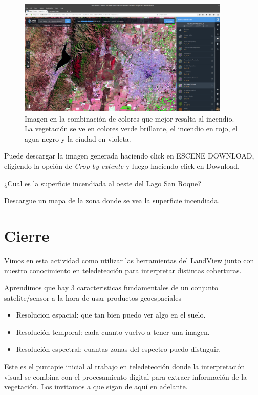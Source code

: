 \documentclass[a4paper,12pt]{book}
\begin{document}
\begin{figure}[h!]
    \centering
    \includegraphics[width=0.9\textwidth]{fig:incendio.png}
    \caption{Imagen en la combinación de colores que mejor resalta al incendio. La vegetación se ve en colores verde brillante, el incendio en rojo, el agua negro y la ciudad en violeta.}
    \label{fig:incendio}
\end{figure}

Puede descargar la imagen generada haciendo click en ESCENE DOWNLOAD, eligiendo la opción de \emph{Crop by extente} y luego haciendo click en Download.

\begin{que}
    ¿Cual es la superficie incendiada al oeste del Lago San Roque?
\end{que}

\begin{que}
    Descargue un mapa de la zona donde se vea la superficie incendiada.
\end{que}

\chapter{Cierre}

Vimos en esta actividad como utilizar las herramientas del LandView junto con nuestro conocimiento en teledetección para interpretar distintas coberturas.

Aprendimos que hay 3 caracteristicas fundamentales de un conjunto satelite/sensor a la hora de usar productos geoespaciales

\begin{itemize}
    \item Resolucion espacial: que tan bien puedo ver algo en el suelo.
    \item Resolución temporal: cada cuanto vuelvo a tener una imagen.
    \item Resolución espectral: cuantas zonas del espectro puedo distnguir.
\end{itemize}

Este es el puntapie inicial al trabajo en teledetección donde la interpretación visual se combina con el procesamiento digital para extraer información de la vegetación. Los invitamos a que sigan de aquí en adelante.
\end{document}
